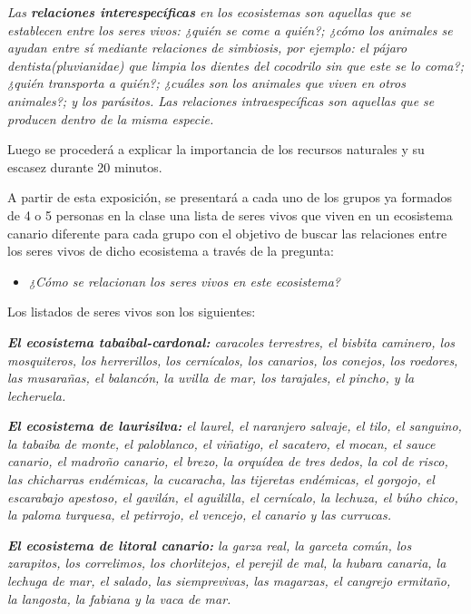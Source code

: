 \documentclass[
]{article}
\providecommand{\tightlist}{%
  \setlength{\itemsep}{0pt}\setlength{\parskip}{0pt}}
\begin{document}
\emph{Las \textbf{relaciones interespecíficas} en los ecosistemas son
aquellas que se establecen entre los seres vivos: ¿quién se come a
quién?; ¿cómo los animales se ayudan entre sí mediante relaciones de
simbiosis, por ejemplo: el pájaro dentista(pluvianidae) que limpia los
dientes del cocodrilo sin que este se lo coma?; ¿quién transporta a
quién?; ¿cuáles son los animales que viven en otros animales?; y los
parásitos. Las relaciones intraespecíficas son aquellas que se producen
dentro de la misma especie.}

Luego se procederá a explicar la importancia de los recursos naturales y
su escasez durante 20 minutos.

A partir de esta exposición, se presentará a cada uno de los grupos ya
formados de 4 o 5 personas en la clase una lista de seres vivos que
viven en un ecosistema canario diferente para cada grupo con el objetivo
de buscar las relaciones entre los seres vivos de dicho ecosistema a
través de la pregunta:

\begin{itemize}
\tightlist
\item
  \emph{¿Cómo se relacionan los seres vivos en este ecosistema?}
\end{itemize}

Los listados de seres vivos son los siguientes:

\emph{\textbf{El ecosistema tabaibal-cardonal:} caracoles terrestres, el
bisbita caminero, los mosquiteros, los herrerillos, los cernícalos, los
canarios, los conejos, los roedores, las musarañas, el balancón, la
uvilla de mar, los tarajales, el pincho, y la lecheruela.}

\emph{\textbf{El ecosistema de laurisilva:} el laurel, el naranjero
salvaje, el tilo, el sanguino, la tabaiba de monte, el paloblanco, el
viñatigo, el sacatero, el mocan, el sauce canario, el madroño canario,
el brezo, la orquídea de tres dedos, la col de risco, las chicharras
endémicas, la cucaracha, las tijeretas endémicas, el gorgojo, el
escarabajo apestoso, el gavilán, el aguililla, el cernícalo, la lechuza,
el búho chico, la paloma turquesa, el petirrojo, el vencejo, el canario
y las currucas.}

\emph{\textbf{El ecosistema de litoral canario:} la garza real, la
garceta común, los zarapitos, los correlimos, los chorlitejos, el
perejil de mal, la hubara canaria, la lechuga de mar, el salado, las
siemprevivas, las magarzas, el cangrejo ermitaño, la langosta, la
fabiana y la vaca de mar.}
\end{document}
